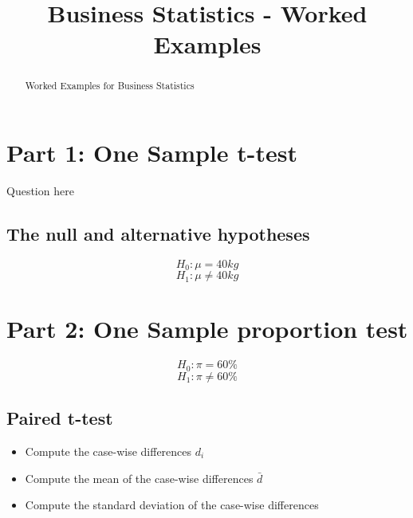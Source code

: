 \documentclass[12 pt]{report}
\title{Business Statistics - Worked Examples}
\author{}
\begin{document}
\maketitle

\begin{abstract}
Worked Examples for Business Statistics
\end{abstract}

\section*{Part 1: One Sample t-test}
Question here

\subsection*{The null and alternative hypotheses}
\[ H_0: \mu = 40 kg\]
\[ H_1: \mu \neq 40 kg\]

\section{Part 2: One Sample proportion test}
\[ H_0: \pi = 60\%\]
\[ H_1: \pi \neq 60\%\]


\subsection{Paired t-test}
\begin{itemize}
\item Compute the case-wise differences $d_i$
\item Compute the mean of the case-wise differences $\bar{d}$
\item Compute the standard deviation of the case-wise differences
\end{itemize}
\end{document}
